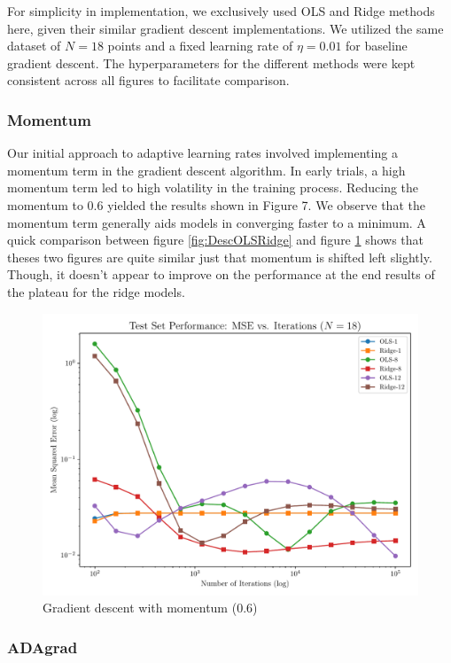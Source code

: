 \documentclass[twocolumn,aps]{revtex4}
\begin{document}
For simplicity in implementation, we exclusively used OLS and Ridge methods here, given their similar gradient descent implementations. 
We utilized the same dataset of $N=18$ points and a fixed learning rate of $\eta=0.01$ for baseline gradient descent. 
The hyperparameters for the different methods were kept consistent across all figures to facilitate comparison.

\subsubsection{Momentum}

Our initial approach to adaptive learning rates involved implementing a momentum term in the gradient descent algorithm. 
In early trials, a high momentum term led to high volatility in the training process. 
Reducing the momentum to $0.6$ yielded the results shown in Figure 7. 
We observe that the momentum term generally aids models in converging faster to a minimum.
A quick comparison between figure \ref{fig:DescOLSRidge} and figure \ref{fig:GradMomentum} shows that theses two figures are quite similar just that momentum is shifted left slightly.
Though, it doesn't appear to improve on the performance at the end results of the plateau for the ridge models.
\\
\begin{figure}[h]
    \centering
    \includegraphics[width=.95 \linewidth]{Figures/OLS_Ridge_Momentum.pdf}
    \caption{Gradient descent with momentum (0.6)}
    \label{fig:GradMomentum}
\end{figure}


\subsubsection{ADAgrad}
\end{document}
